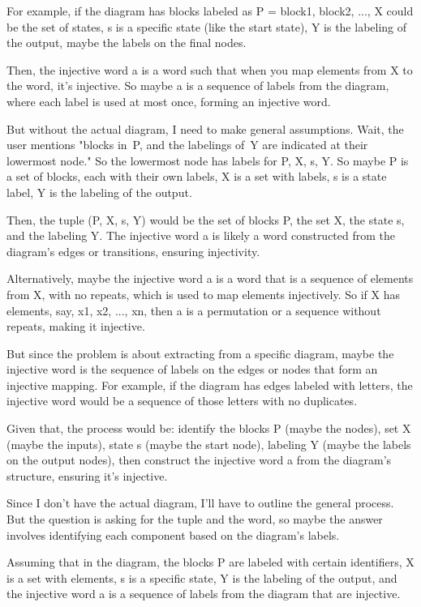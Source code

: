 For example, if the diagram has blocks labeled as P = {block1, block2, ...}, X could be the set of states, s is a specific state (like the start state), Y is the labeling of the output, maybe the labels on the final nodes.

Then, the injective word a is a word such that when you map elements from X to the word, it's injective. So maybe a is a sequence of labels from the diagram, where each label is used at most once, forming an injective word.

But without the actual diagram, I need to make general assumptions. Wait, the user mentions "blocks in~P, and the labelings of~Y are indicated at their lowermost node." So the lowermost node has labels for P, X, s, Y. So maybe P is a set of blocks, each with their own labels, X is a set with labels, s is a state label, Y is the labeling of the output.

Then, the tuple (P, X, s, Y) would be the set of blocks P, the set X, the state s, and the labeling Y. The injective word a is likely a word constructed from the diagram's edges or transitions, ensuring injectivity.

Alternatively, maybe the injective word a is a word that is a sequence of elements from X, with no repeats, which is used to map elements injectively. So if X has elements, say, x1, x2, ..., xn, then a is a permutation or a sequence without repeats, making it injective.

But since the problem is about extracting from a specific diagram, maybe the injective word is the sequence of labels on the edges or nodes that form an injective mapping. For example, if the diagram has edges labeled with letters, the injective word would be a sequence of those letters with no duplicates.

Given that, the process would be: identify the blocks P (maybe the nodes), set X (maybe the inputs), state s (maybe the start node), labeling Y (maybe the labels on the output nodes), then construct the injective word a from the diagram's structure, ensuring it's injective.

Since I don't have the actual diagram, I'll have to outline the general process. But the question is asking for the tuple and the word, so maybe the answer involves identifying each component based on the diagram's labels.

Assuming that in the diagram, the blocks P are labeled with certain identifiers, X is a set with elements, s is a specific state, Y is the labeling of the output, and the injective word a is a sequence of labels from the diagram that are injective.

